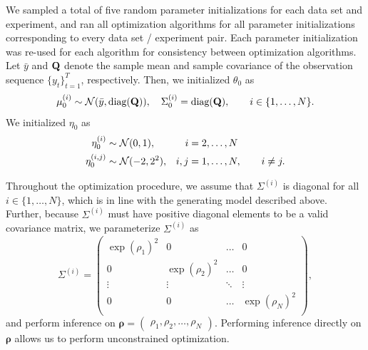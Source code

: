 We sampled a total of five random parameter initializations for each data set and experiment, and ran all optimization algorithms for all parameter initializations corresponding to every data set / experiment pair. Each parameter initialization was re-used for each algorithm for consistency between optimization algorithms. Let $\bar y$ and $\mathbf{Q}$ denote the sample mean and sample covariance of the observation sequence $\{y_t\}_{t=1}^T$, respectively. Then, we initialized $\theta_0$ as
%
\begin{equation}
    \mu^{(i)}_0 \sim \mathcal{N}(\bar y, \text{diag}(\mathbf{Q})), \quad \Sigma^{(i)}_0 = \text{diag}(\mathbf{Q}), \qquad i \in \{1,\ldots,N\}.
\end{equation}
%
We initialized $\eta_0$ as
%
\begin{align*}
    \eta^{(i)}_0 &\sim \mathcal{N}(0,1), & i & = 2,\ldots,N \\
    \eta^{(i,j)}_0 &\sim \mathcal{N}(-2,2^2), & i,j & = 1,\ldots,N, \qquad i \neq j.
\end{align*}
%

Throughout the optimization procedure, we assume that $\Sigma^{(i)}$ is diagonal for all $i \in \{1,\ldots,N\}$, which is in line with the generating model described above. Further, because $\Sigma^{(i)}$ must have positive diagonal elements to be a valid covariance matrix, we parameterize $\Sigma^{(i)}$ as 
%
\begin{equation}
    \Sigma^{(i)} = 
    \begin{pmatrix}
        \exp(\rho_1)^2 & 0 & \ldots & 0 \\
        0 & \exp(\rho_2)^2 & \ldots & 0 \\
        \vdots & \vdots & \ddots & \vdots \\
        0 & 0 & \ldots & \exp(\rho_N)^2 \\
    \end{pmatrix},
\end{equation}
%
and perform inference on $\boldsymbol{\rho} = \begin{pmatrix} \rho_1, \rho_2, \ldots , \rho_N \end{pmatrix}$. Performing inference directly on $\boldsymbol{\rho}$ allows us to perform unconstrained optimization.

